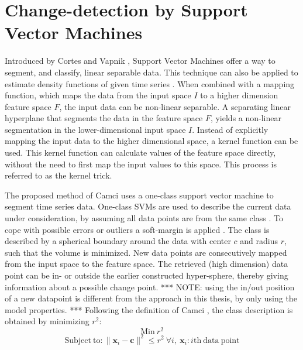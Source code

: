 \section{Change-detection by Support Vector Machines}\label{svm}

Introduced by Cortes and Vapnik \cite{vapnik1998statistical, vapnik1999nature}, Support Vector Machines offer a way to segment, and classify, linear separable data.
This technique can also be applied to estimate density functions of given time series \cite{weston1999support}.
When combined with a mapping function, which maps the data from the input space $I$ to a higher dimension feature space $F$, the input data can be non-linear separable.
A separating linear hyperplane that segments the data in the feature space $F$, yields a non-linear segmentation in the lower-dimensional input space $I$.
Instead of explicitly mapping the input data to the higher dimensional space, a kernel function can be used.
This kernel function can calculate values of the feature space directly, without the need to first map the input values to this space.
This process is referred to as the kernel trick.

The proposed method of Camci \cite{camci2010change} uses a one-class support vector machine to segment time series data.
One-class SVMs are used to describe the current data under consideration, by assuming all data points are from the same class \cite{tax2001one}.
To cope with possible errors or outliers a soft-margin is applied \cite{cortes1995support}.
The class is described by a spherical boundary around the data with center $c$ and radius $r$, such that the volume is minimized.
New data points are consecutively mapped from the input space to the feature space.
The retrieved (high dimension) data point can be in- or outside the earlier constructed hyper-sphere, thereby giving information about a possible change point.
*** NOTE: using the in/out position of a new datapoint is different from the approach in this thesis, by only using the model properties. ***
Following the definition of Camci \cite{camci2010change}, the class description is obtained by minimizing $r^2$:
\begin{equation}
  \mathrm{Min}\ r^2
\end{equation}
\begin{equation}
  \mathrm{Subject\ to} : \|\mathbf{x}_i - \mathbf{c}\|^2 \le r^2\ \forall i,\ \mathbf{x}_i : i \mathrm{th\ data\ point}
\end{equation}

